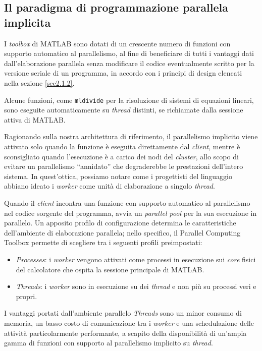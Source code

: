 \nocite{MathWorksParallelQuickStart}
\subsection{Il paradigma di programmazione parallela implicita}
I \textit{toolbox} di MATLAB sono dotati di un crescente numero di funzioni con supporto automatico al parallelismo, al fine di beneficiare di tutti 
i vantaggi dati dall'elaborazione parallela senza modificare il codice eventualmente scritto per la versione seriale di un programma, in accordo con i principi di design elencati 
nella sezione \ref{sec2.1.2}. 

Alcune funzioni, come \lstinline|mldivide| per la risoluzione di sistemi di equazioni lineari, sono eseguite automaticamente su \textit{thread} 
distinti, se richiamate dalla sessione attiva di MATLAB. 

Ragionando sulla nostra architettura di riferimento, il parallelismo implicito viene attivato solo quando la funzione \`e eseguita direttamente dal \textit{client}, 
mentre \`e sconsigliato quando l'esecuzione \`e a carico dei nodi del \textit{cluster}, allo scopo di evitare un parallelismo \enquote{annidato} che degraderebbe le prestazioni 
dell'intero sistema. \newline
In quest'ottica, possiamo notare come i progettisti del linguaggio abbiano ideato i \textit{worker} come unit\`a di elaborazione a singolo \textit{thread}.

Quando il \textit{client} incontra una funzione con supporto automatico al parallelismo nel codice sorgente del programma, avvia un \textit{parallel pool} per la sua esecuzione in parallelo. \newline
Un apposito profilo di configurazione determina le caratteristiche dell'ambiente di elaborazione parallela; nello specifico, il Parallel Computing Toolbox permette di scegliere tra i 
seguenti profili preimpostati:
\begin{itemize}
    \item \textit{Processes}: i \textit{worker} vengono attivati come processi in esecuzione sui \textit{core} fisici del calcolatore che ospita la sessione 
    principale di MATLAB.
    \item \textit{Threads}: i \textit{worker} sono in esecuzione su dei \textit{thread} e non pi\`u su processi veri e propri.
\end{itemize}
I vantaggi portati dall'ambiente 
parallelo \textit{Threads} sono un minor consumo di memoria, un basso costo di comunicazione tra i \textit{worker} e una schedulazione delle attivit\`a particolarmente 
performante, a scapito della disponibilit\`a di un'ampia gamma di funzioni con supporto al parallelismo implicito su \textit{thread}.

